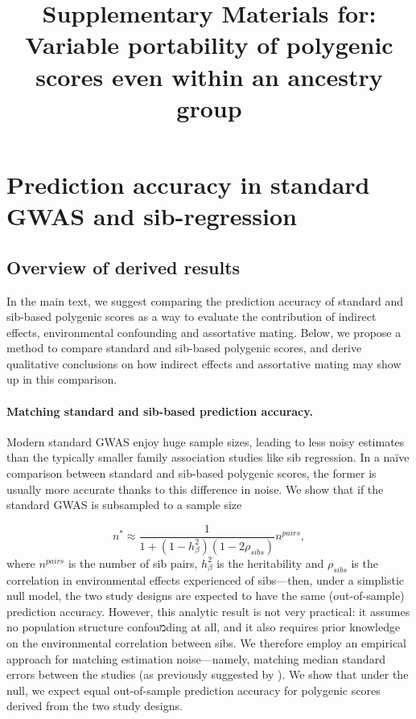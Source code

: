 \documentclass[hidelinks, 12pt]{article}
\title{Supplementary Materials for: Variable portability of polygenic scores even within an ancestry group}
\newcommand{\beginsupplement}{%
    \setcounter{table}{0}
    \renewcommand{\thetable}{S\arabic{table}}%
    \setcounter{figure}{0}
    \renewcommand{\thefigure}{S\arabic{figure}}%
}
\begin{document}
 
\baselineskip24pt

\maketitle 
\begin{center}
\end{center}
\clearpage

\begingroup
  \hypersetup{hidelinks}
  \tableofcontents
\endgroup

\listoffigures
\listoftables

\pagebreak

\beginsupplement

\section{Prediction accuracy in standard GWAS and sib-regression}
\subsection{Overview of derived results}
In the main text, we suggest comparing the prediction accuracy of standard and sib-based polygenic scores as a way to evaluate the contribution of indirect effects, environmental confounding and assortative mating.  Below, we propose a method to compare standard and sib-based polygenic scores, and derive qualitative conclusions on how indirect effects and assortative mating may show up in this comparison.  

\paragraph{Matching standard and sib-based prediction accuracy.} Modern standard GWAS enjoy huge sample sizes, leading to less noisy estimates than the typically smaller family association studies like sib regression.  In a na{\"i}ve comparison between standard and sib-based polygenic scores, the former is usually more accurate thanks to this difference in noise.  We show that if the standard GWAS is subsampled to a sample size 

$$n^* \approx \frac{1}{1+(1-h_{\beta}^2)(1-2\rho_{sibs})}n^{pairs},$$
where $n^{pairs}$ is the number of sib pairs, $h_{\beta}^2$ is the heritability and $\rho_{sibs}$ is the correlation in environmental effects experienced of sibs---then, under a simplistic null model, the two study designs are expected to have the same (out-of-sample) prediction accuracy.  However, this analytic result is not very practical: it assumes no population structure confouמding at all, and it also requires prior knowledge on the environmental correlation between sibs.  We therefore employ an empirical approach for matching estimation noise---namely, matching median standard errors between the studies (as previously suggested by \cite{wood2014defining}).  We show that under the null, we expect equal out-of-sample prediction accuracy for polygenic scores derived from the two study designs.  
\end{document}
